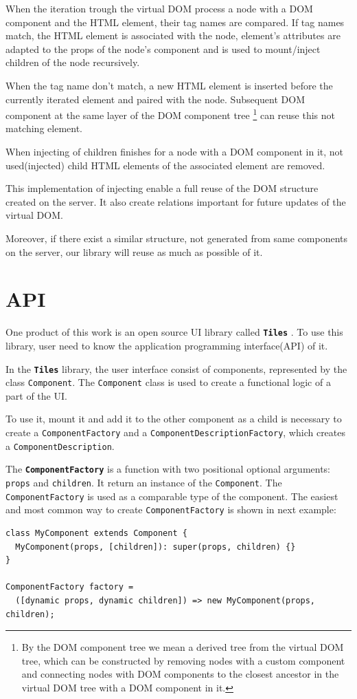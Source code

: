 \documentclass[oneside, 12pt]{book}
\newcommand{\tiles}[0]{\textbf{\texttt{Tiles}} }
\begin{document}
    When the iteration trough the virtual DOM process a node with a DOM component and the HTML element,
    their tag names are compared.
    If tag names match, the HTML element is associated with the node, 
    element's attributes are adapted to the props of the node's component 
    and is used to mount/inject children of the node recursively.

    When the tag name don't match, 
    a new HTML element is inserted before the currently iterated element and paired with the node. 
    Subsequent DOM component at the same layer of the DOM component tree
    \footnote{
      By the DOM component tree we mean a derived tree from the virtual DOM tree, 
      which can be constructed by removing nodes with a custom component
      and connecting nodes with DOM components to the closest ancestor in the virtual DOM tree with a DOM component in it.
    }
    can reuse this not matching element.

    When injecting of children finishes for a node with a DOM component in it, 
    not used(injected) child HTML elements of the associated element are removed.

    This implementation of injecting enable a full reuse of the DOM structure created on the server.
    It also create relations important for future updates of the virtual DOM. 

    Moreover, if there exist a similar structure, not generated from same components on the server, 
    our library will reuse as much as possible of it.

\section{API}\label{sec:our-api}

  One product of this work is an open source UI library called \tiles.
  To use this library, user need to know the application programming interface(API) of it. 

  In the \tiles library, the user interface consist of components, represented by the class \texttt{Component}. 
  The \texttt{Component} class is used to create a functional logic of a part of the UI. 

  To use it, mount it and add it to the other component as a child is necessary to create a \texttt{ComponentFactory} 
  and a \texttt{ComponentDescriptionFactory}, which creates a \texttt{ComponentDescription}.

  The \textbf{\texttt{ComponentFactory}} is a function with two positional optional arguments: \texttt{props} and \texttt{children}.
  It return an instance of the \texttt{Component}. The \texttt{ComponentFactory} is used as a comparable type of the component.
  The easiest and most common way to create \texttt{ComponentFactory} is shown in next example:
\begin{verbatim}
class MyComponent extends Component {
  MyComponent(props, [children]): super(props, children) {}
}

ComponentFactory factory = 
  ([dynamic props, dynamic children]) => new MyComponent(props, children);
\end{verbatim}
\end{document}

